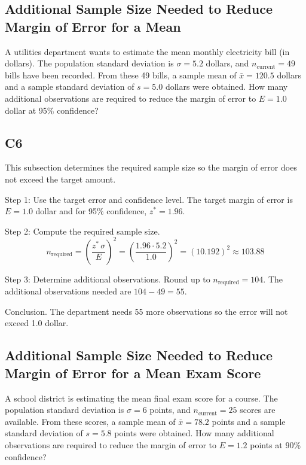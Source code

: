 \begin{ExamProblems}
		\subsection*{Additional Sample Size Needed to Reduce Margin of Error for a Mean}
		A utilities department wants to estimate the mean monthly electricity bill (in dollars). The population standard deviation is $\sigma = 5.2$ dollars, and $n_{\text{current}} = 49$ bills have been recorded. From these 49 bills, a sample mean of $\bar{x} = 120.5$ dollars and a sample standard deviation of $s = 5.0$ dollars were obtained. How many additional observations are required to reduce the margin of error to $E = 1.0$ dollar at 95\% confidence?
		
		\subsection*{C6}
		This subsection determines the required sample size so the margin of error does not exceed the target amount.
		
		Step 1: Use the target error and confidence level. The target margin of error is $E = 1.0$ dollar and for 95\% confidence, $z^* = 1.96$.
		
		Step 2: Compute the required sample size.
		\[
		n_{\text{required}} = \left(\frac{z^*\,\sigma}{E}\right)^2
		= \left(\frac{1.96 \cdot 5.2}{1.0}\right)^2
		= \left(10.192\right)^2
		\approx 103.88
		\]
		
		Step 3: Determine additional observations. Round up to $n_{\text{required}} = 104$. The additional observations needed are $104 - 49 = 55$.
		
		Conclusion. The department needs 55 more observations so the error will not exceed 1.0 dollar.
		
		\item
		\subsection*{Additional Sample Size Needed to Reduce Margin of Error for a Mean Exam Score}
		A school district is estimating the mean final exam score for a course. The population standard deviation is $\sigma = 6$ points, and $n_{\text{current}} = 25$ scores are available. From these scores, a sample mean of $\bar{x} = 78.2$ points and a sample standard deviation of $s = 5.8$ points were obtained. How many additional observations are required to reduce the margin of error to $E = 1.2$ points at 90\% confidence?
		

\end{ExamProblems}

